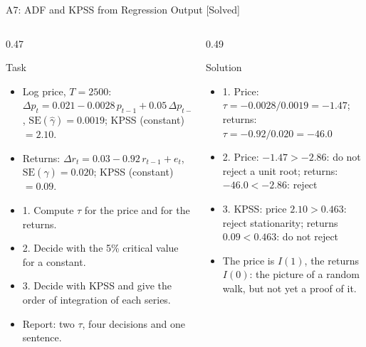 \begin{frame}{A7: ADF and KPSS from Regression Output [Solved]}
\itemsize{\scriptsize}
\begin{columns}[T]
\begin{column}{0.47\textwidth}
\begin{block}{Task}
\begin{itemize}
    \item Log price, $T = 2500$: $\Delta p_t = 0.021 - 0.0028\,p_{t-1} + 0.05\,\Delta p_{t-1} + e_t$, $\mathrm{SE}(\hat\gamma) = 0.0019$; KPSS (constant) $= 2.10$.
    \item Returns: $\Delta r_t = 0.03 - 0.92\,r_{t-1} + e_t$, $\mathrm{SE}(\hat\gamma) = 0.020$; KPSS (constant) $= 0.09$.
    \item 1. Compute $\tau$ for the price and for the returns.
    \item 2. Decide with the 5\% critical value for a constant.
    \item 3. Decide with KPSS and give the order of integration of each series.
    \item Report: two $\tau$, four decisions and one sentence.
\end{itemize}
\end{block}
\end{column}
\begin{column}{0.49\textwidth}
\begin{exampleblock}{Solution}
\begin{itemize}
    \item 1. Price: $\tau = -0.0028/0.0019 = -1.47$; returns: $\tau = -0.92/0.020 = -46.0$
    \item 2. Price: $-1.47 > -2.86$: do not reject a unit root; returns: $-46.0 < -2.86$: reject
    \item 3. KPSS: price $2.10 > 0.463$: reject stationarity; returns $0.09 < 0.463$: do not reject
    \item The price is $I(1)$, the returns $I(0)$: the picture of a random walk, but not yet a proof of it.
\end{itemize}
\end{exampleblock}
\end{column}
\end{columns}
\end{frame}

